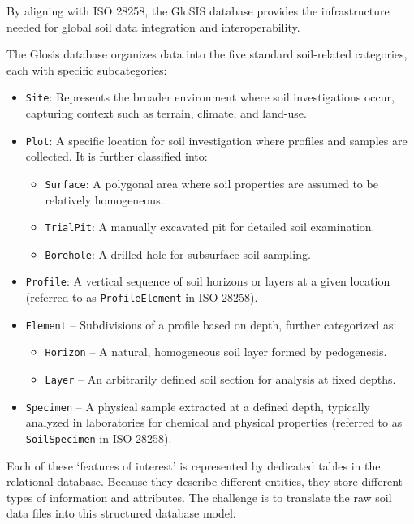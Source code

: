 \documentclass[
  10pt,
  b5paper,
  oneside]{book}
\providecommand{\tightlist}{%
  \setlength{\itemsep}{0pt}\setlength{\parskip}{0pt}}
\begin{document}
By aligning with ISO 28258, the GloSIS database provides the infrastructure needed for global soil data integration and interoperability.

The Glosis database organizes data into the five standard soil-related categories, each with specific subcategories:

\begin{itemize}
\item
  \texttt{Site}: Represents the broader environment where soil investigations occur, capturing context such as terrain, climate, and land-use.
\item
  \texttt{Plot}: A specific location for soil investigation where profiles and samples are collected. It is further classified into:

  \begin{itemize}
  \tightlist
  \item
    \texttt{Surface}: A polygonal area where soil properties are assumed to be relatively homogeneous.
  \item
    \texttt{TrialPit}: A manually excavated pit for detailed soil examination.
  \item
    \texttt{Borehole}: A drilled hole for subsurface soil sampling.
  \end{itemize}
\item
  \texttt{Profile}: A vertical sequence of soil horizons or layers at a given location (referred to as \texttt{ProfileElement} in ISO 28258).
\item
  \texttt{Element} -- Subdivisions of a profile based on depth, further categorized as:

  \begin{itemize}
  \tightlist
  \item
    \texttt{Horizon} -- A natural, homogeneous soil layer formed by pedogenesis.
  \item
    \texttt{Layer} -- An arbitrarily defined soil section for analysis at fixed depths.
  \end{itemize}
\item
  \texttt{Specimen} -- A physical sample extracted at a defined depth, typically analyzed in laboratories for chemical and physical properties (referred to as \texttt{SoilSpecimen} in ISO 28258).
\end{itemize}

Each of these `features of interest' is represented by dedicated tables in the relational database. Because they describe different entities, they store different types of information and attributes. The challenge is to translate the raw soil data files into this structured database model.
\end{document}
